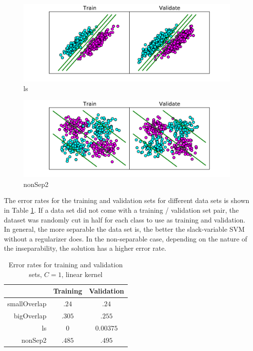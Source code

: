 \documentclass[10pt]{article}
\begin{document}
\begin{figure}[!ht]
	\centering
	\includegraphics[width=\textwidth]{1-2-ls.pdf}
	\caption{ls}
	\label{fig:1-2-ls}
\end{figure}

\begin{figure}[!ht]
	\centering
	\includegraphics[width=\textwidth]{1-2-nonSep2.pdf}
	\caption{nonSep2}
	\label{fig:1-2-nonSep2}
\end{figure}

The error rates for the training and validation sets for different data sets is shown in Table \ref{tbl:1-2-error}. If a data set did not come with a training / validation set pair, the dataset was randomly cut in half for each class to use as training and validation. In general, the more separable the data set is, the better the slack-variable SVM without a regularizer does. In the non-separable case, depending on the nature of the inseparability, the solution has a higher error rate.

\begin{table}
\centering
\begin{tabular}{r|c|c}
	& Training & Validation \\ \hline
	smallOverlap & $.24$ & $.24$ \\
	bigOverlap & $.305$ & $.255$ \\
	ls & $0$ & $0.00375$ \\
	nonSep2 & $.485$ & $.495$ 
\end{tabular}
\caption{Error rates for training and validation sets, $C = 1$, linear kernel}
\label{tbl:1-2-error}
\end{table}
\end{document}
